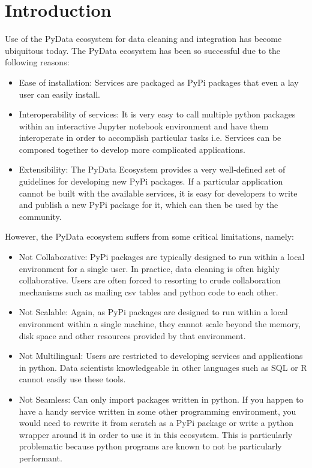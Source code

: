 \section{Introduction}

Use of the PyData ecosystem for data cleaning and integration has become ubiquitous today.
The PyData ecosystem has been so successful due to the following reasons:
\begin{itemize}
  \item Ease of installation: Services are packaged as PyPi packages that even a lay user can easily install.
  \item Interoperability of services: It is very easy to call multiple python packages within an interactive Jupyter notebook environment and have them interoperate in order to accomplish particular tasks i.e. Services can be composed together to develop more complicated applications.
  \item Extensibility: The PyData Ecosystem provides a very well-defined set of guidelines for developing new PyPi packages. 
    If a particular application cannot be built with the available services, it is easy for developers to write and publish a new PyPi package for it, which can then be used by the community.
\end{itemize}

However, the PyData ecosystem suffers from some critical limitations, namely:
\begin{itemize}
  \item Not Collaborative: PyPi packages are typically designed to run within a local environment for a single user.
    In practice, data cleaning is often highly collaborative.
    Users are often forced to resorting to crude collaboration mechanisms such as mailing csv tables and python code to each other.
  \item Not Scalable: Again, as PyPi packages are designed to run within a local environment within a single machine, 
    they cannot scale beyond the memory, disk space and other resources provided by that environment.
  \item Not Multilingual: Users are restricted to developing services and applications in python. 
    Data scientists knowledgeable in other languages such as SQL or R cannot easily use these tools.
  \item Not Seamless: Can only import packages written in python.
    If you happen to have a handy service written in some other programming environment,
    you would need to rewrite it from scratch as a PyPi package or write a python wrapper around it in order to use it in this ecosystem.
    This is particularly problematic because python programs are known to not be particularly performant.
\end{itemize}

